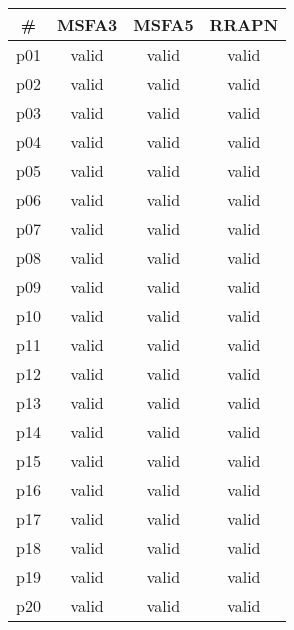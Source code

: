 \begin{tabular}{cccc}
\toprule
\textbf{\#} & \textbf{MSFA3} & \textbf{MSFA5} & \textbf{RRAPN}\\
\midrule
p01 & valid & valid & valid\\
p02 & valid & valid & valid\\
p03 & valid & valid & valid\\
p04 & valid & valid & valid\\
p05 & valid & valid & valid\\
p06 & valid & valid & valid\\
p07 & valid & valid & valid\\
p08 & valid & valid & valid\\
p09 & valid & valid & valid\\
p10 & valid & valid & valid\\
p11 & valid & valid & valid\\
p12 & valid & valid & valid\\
p13 & valid & valid & valid\\
p14 & valid & valid & valid\\
p15 & valid & valid & valid\\
p16 & valid & valid & valid\\
p17 & valid & valid & valid\\
p18 & valid & valid & valid\\
p19 & valid & valid & valid\\
p20 & valid & valid & valid\\
\bottomrule
\end{tabular}

